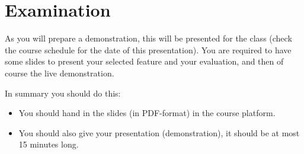 \documentclass[a4paper,nocourse]{miunasgn}
\begin{document}
\section{Examination}
\label{sec:examination}
As you will prepare a demonstration, this will be presented for the class 
(check the course schedule for the date of this presentation).
You are required to have some slides to present your selected feature and your 
evaluation, and then of course the live demonstration.

In summary you should do this:
\begin{itemize}
  \item You should hand in the slides (in PDF-format) in the course platform.
  \item You should also give your presentation (demonstration), it should be at 
    most 15 minutes long.
\end{itemize}


\printbibliography
\end{document}
